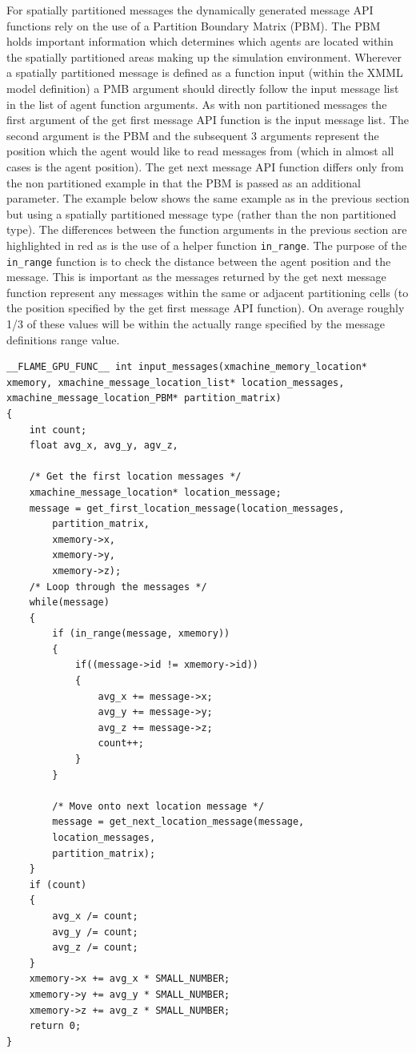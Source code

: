 \documentclass[11pt, a4paper, onecolumn, oneside]{report}
\begin{document}
For spatially partitioned messages the dynamically generated message API functions rely on the use of a Partition Boundary Matrix (PBM).
The PBM holds important information which determines which agents are located within the spatially partitioned areas making up the simulation environment.
Wherever a spatially partitioned message is defined as a function input (within the XMML model definition) a PMB argument should directly follow the input message list in the list of agent function arguments.
As with non partitioned messages the first argument of the get first message API function is the input message list.
The second argument is the PBM and the subsequent 3 arguments represent the position which the agent would like to read messages from (which in almost all cases is the agent position).
The get next message API function differs only from the non partitioned example in that the PBM is passed as an additional parameter.
The example below shows the same example as in the previous section but using a spatially partitioned message type (rather than the non partitioned type).
The differences between the function arguments in the previous section are highlighted in red as is the use of a helper function \texttt{in_range}.
The purpose of the \texttt{in_range} function is to check the distance between the agent position and the message.
This is important as the messages returned by the get next message function represent any messages within the same or adjacent partitioning cells (to the position specified by the get first message API function).
On average roughly 1/3 of these values will be within the actually range specified by the message definitions range value.


\begin{verbatim}
__FLAME_GPU_FUNC__ int input_messages(xmachine_memory_location* xmemory, xmachine_message_location_list* location_messages, xmachine_message_location_PBM* partition_matrix)
{
    int count;
    float avg_x, avg_y, agv_z,

    /* Get the first location messages */
    xmachine_message_location* location_message;
    message = get_first_location_message(location_messages,
        partition_matrix,
        xmemory->x,
        xmemory->y,
        xmemory->z);
    /* Loop through the messages */
    while(message)
    {
        if (in_range(message, xmemory))
        {
            if((message->id != xmemory->id))
            {
                avg_x += message->x;
                avg_y += message->y;
                avg_z += message->z;
                count++;
            }
        }

        /* Move onto next location message */
        message = get_next_location_message(message,
        location_messages,
        partition_matrix);
    }
    if (count)
    {
        avg_x /= count;
        avg_y /= count;
        avg_z /= count;
    }
    xmemory->x += avg_x * SMALL_NUMBER;
    xmemory->y += avg_y * SMALL_NUMBER;
    xmemory->z += avg_z * SMALL_NUMBER;
    return 0;
}
\end{verbatim}
\end{document}

